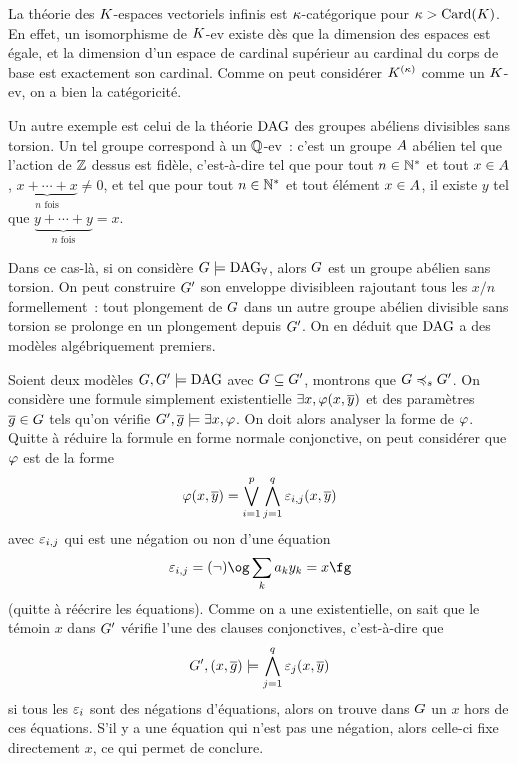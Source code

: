 \begin{remark}
  La théorie des $K$-espaces vectoriels infinis est $\kappa$-catégorique
  pour $\kappa > \operatorname{Card}(K)$. En effet, un isomorphisme de $K$-ev existe
  dès que la dimension des espaces est égale, et la dimension d'un espace de
  cardinal supérieur au cardinal du corps de base est exactement son cardinal.
  Comme on peut considérer $K^{(\kappa)}$ comme un $K$-ev, on a bien la
  catégoricité.
\end{remark}

\begin{example}
  Un autre exemple est celui de la théorie $\operatorname{DAG}$ des groupes abéliens
  divisibles sans torsion. Un tel groupe correspond à un $\mathbb Q$-ev~: c'est un
  groupe $A$ abélien tel que l'action de $\mathbb Z$ dessus est fidèle,
  c'est-à-dire tel que pour tout $n \in \mathbb N^*$ et tout $x \in A$,
  $\underbrace{x + \cdots + x}_{n\text{ fois}} \neq 0$, et tel
  que pour tout $n \in \mathbb N^*$ et tout élément $x \in A$, il existe $y$ tel
  que $\underbrace{y + \cdots + y}_{n\text{ fois}} = x$.

  Dans ce cas-là, si on considère $G\models\operatorname{DAG}_\forall$, alors
  $G$ est un groupe abélien sans torsion. On peut construire
  $G'$ son \og enveloppe divisible\fg en rajoutant tous les
  $x/n$ formellement~: tout plongement de $G$ dans un autre groupe
  abélien divisible sans torsion se prolonge en un plongement depuis
  $G'$. On en déduit que $\operatorname{DAG}$ a des modèles algébriquement premiers.

  Soient deux modèles $G,G'\models\operatorname{DAG}$ avec
  $G\subseteq G'$, montrons que $G\preccurlyeq_{s}G'$.
  On considère une formule simplement existentielle
  $\exists x, \varphi(x,\overline{y})$ et des paramètres $\overline{g} \in G$ tels
  qu'on vérifie $G',\overline{g}\models\exists x, \varphi$. On doit alors
  analyser la forme de $\varphi$. Quitte à réduire la formule en forme normale
  conjonctive, on peut considérer que $\varphi$ est de la forme
  \[\varphi(x,\overline{y}) =
  \bigvee_{i = 1}^{p}\bigwedge_{j = 1}^{q} \varepsilon_{i,j}(x, \overline{y})\]
  avec $\varepsilon_{i,j}$ qui est une négation ou non d'une équation
  \[\vareps_{i,j} = (\lnot) \ogM \sum_{k} a_k y_k = x \fgM\]
  (quitte à réécrire les équations). Comme on a une existentielle, on sait que
  le témoin $x$ dans $G'$ vérifie l'une des clauses conjonctives,
  c'est-à-dire que
  \[G',(x,\overline{g}) \models\bigwedge_{j = 1}^q \varepsilon_{j}(x,\overline{y})\]
  si tous les $\varepsilon_i$ sont des négations d'équations, alors on trouve
  dans $G$ un $x$ hors de ces équations. S'il y a une équation qui n'est
  pas une négation, alors celle-ci fixe directement $x$, ce qui permet de
  conclure.
\end{example}


